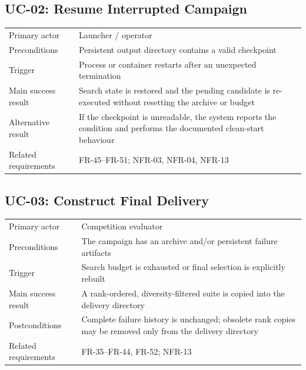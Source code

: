 \documentclass[11pt,a4paper,openany]{report}
\begin{document}
\subsection{UC-02: Resume Interrupted Campaign}
\begin{tabularx}{\textwidth}{L{3.4cm} Y}
\toprule
Primary actor & Launcher / operator\\
Preconditions & Persistent output directory contains a valid checkpoint\\
Trigger & Process or container restarts after an unexpected termination\\
Main success result & Search state is restored and the pending candidate is re-executed without resetting the archive or budget\\
Alternative result & If the checkpoint is unreadable, the system reports the condition and performs the documented clean-start behaviour\\
Related requirements & FR-45--FR-51; NFR-03, NFR-04, NFR-13\\
\bottomrule
\end{tabularx}

\subsection{UC-03: Construct Final Delivery}
\begin{tabularx}{\textwidth}{L{3.4cm} Y}
\toprule
Primary actor & Competition evaluator\\
Preconditions & The campaign has an archive and/or persistent failure artifacts\\
Trigger & Search budget is exhausted or final selection is explicitly rebuilt\\
Main success result & A rank-ordered, diversity-filtered suite is copied into the delivery directory\\
Postconditions & Complete failure history is unchanged; obsolete rank copies may be removed only from the delivery directory\\
Related requirements & FR-35--FR-44, FR-52; NFR-13\\
\bottomrule
\end{tabularx}
\end{document}
